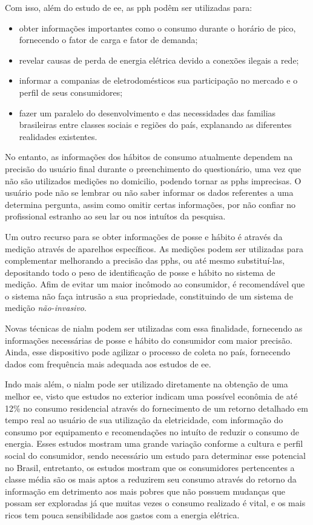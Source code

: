 Com isso, além do estudo de \gls{ee}, as \gls{pph} podêm ser utilizadas para: 

\begin{itemize}
\item obter informações importantes como o consumo durante o horário de pico,
fornecendo o fator de carga e fator de demanda;
\item revelar causas de perda de energia elétrica devido a conexões ilegais a
rede;
\item informar a companias de eletrodomésticos sua participação no mercado e 
o perfil de seus consumidores;
\item fazer um paralelo do desenvolvimento e das necessidades das familias 
brasileiras entre classes sociais e regiões do país, explanando as 
diferentes realidades existentes.
\end{itemize}

No entanto, as informações dos hábitos de consumo atualmente dependem
na precisão do usuário final durante o preenchimento do questionário, uma vez que
não são utilizados medições no domicilio, podendo tornar as \glspl{pph}
imprecisas. O usuário pode não se lembrar ou não saber informar os dados
referentes a uma determina pergunta, assim como omitir certas informações, 
por não confiar no profissional estranho ao seu lar ou nos intuítos da pesquisa.

Um outro recurso para se obter informações de posse e hábito é através da medição 
através de aparelhos específicos. As medições podem ser utilizadas para
complementar melhorando a precisão das \glspl{pph}, ou até mesmo substituí-las,
depositando todo o peso de identificação de posse e hábito no sistema de
medição. Afim de evitar um maior incômodo ao consumidor, é recomendável que o 
sistema não faça intrusão a sua propriedade, constituindo de um sistema de
medição \emph{não-invasivo}. 

Novas técnicas de \gls{nialm} podem ser utilizadas com essa finalidade, 
fornecendo as informações necessárias de posse e hábito do consumidor com
maior precisão. Ainda, esse dispositivo pode agilizar o processo de coleta no país,
fornecendo dados com frequência mais adequada aos estudos de \gls{ee}. 

Indo mais além, o \gls{nialm} pode ser utilizado diretamente na obtenção de 
uma melhor \gls{ee}, visto que estudos no exterior \cite{} indicam uma possível
econômia de até 12\% no consumo residencial através do fornecimento de um
retorno detalhado em tempo real ao usuário de sua utilização da eletricidade, 
com informação do consumo por equipamento e recomendações no intuíto de reduzir
o consumo de energia. Esses estudos mostram uma grande variação conforme a
cultura e perfil social do consumidor, sendo necessário um estudo para
determinar esse potencial no Brasil, entretanto, os estudos mostram que os
consumidores pertencentes a classe média são os mais aptos a reduzirem seu
consumo através do retorno da informação em detrimento aos mais pobres que não
possuem mudanças que possam ser exploradas já que muitas vezes o consumo
realizado é vital, e os mais ricos tem pouca sensibilidade aos gastos com a
energia elétrica.

